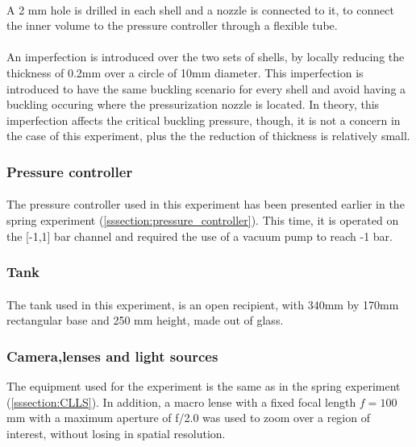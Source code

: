 \paragraph{}
A 2 mm hole is drilled in each shell and a nozzle is connected to it, to connect the inner volume to the pressure controller through a flexible tube.
\paragraph{}
An imperfection is introduced over the two sets of shells, by locally reducing the thickness of 0.2mm over a circle of 10mm diameter. This imperfection is introduced to have the same buckling scenario for every shell and avoid having a buckling occuring where the pressurization nozzle is located.
In theory, this imperfection affects the critical buckling pressure\cite{Preis}, though, it is not a concern in the case of this experiment, plus the the reduction of thickness is relatively small.
\subsubsection{Pressure controller}
\paragraph{}
The pressure controller used in this experiment has been presented earlier in the spring experiment (\ref{sssection:pressure_controller}). This time, it is operated on the [-1,1] bar channel and required the use of a vacuum pump to reach -1 bar.
\subsubsection{Tank}
\paragraph{}
The tank used in this experiment, is an open recipient, with 340mm by 170mm rectangular base and 250 mm height, made out of glass.  
\subsubsection{Camera,lenses and light sources}
The equipment used for the experiment is the same as in the spring experiment (\ref{sssection:CLLS}). In addition, a macro lense with a fixed focal length $f= 100$ mm with a maximum aperture of f/2.0 was used to zoom over a region of interest, without losing in spatial resolution.
  
